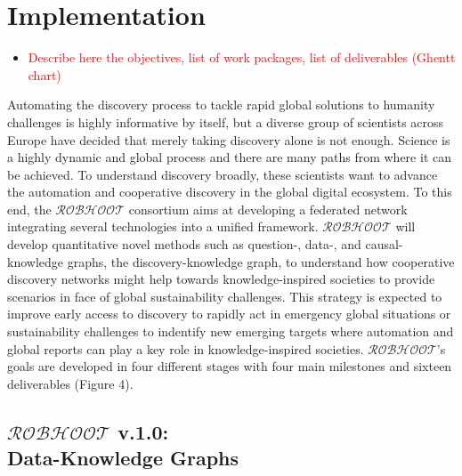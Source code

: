 \documentclass[11pt, a4paper]{article} %
\begin{document}
\section{Implementation}

\begin{itemize}
\item \textcolor{red}{Describe here the objectives, list of work
    packages, list of deliverables (Ghentt chart)}
\end{itemize}
    
Automating the discovery process to tackle rapid global solutions to
humanity challenges is highly informative by itself, but a diverse
group of scientists across Europe have decided that merely taking
discovery alone is not enough. Science is a highly dynamic and global
process and there are many paths from where it can be achieved. To
understand discovery broadly, these scientists want to advance the
automation and cooperative discovery in the global digital
ecosystem. To this end, the $\mathcal{ROBHOOT}$ consortium aims at
developing a federated network integrating several technologies into a
unified framework. $\mathcal{ROBHOOT}$ will develop quantitative novel
methods such as question-, data-, and causal-knowledge graphs, the
discovery-knowledge graph, to understand how cooperative discovery
networks might help towards knowledge-inspired societies to provide
scenarios in face of global sustainability challenges. This strategy
is expected to improve early access to discovery to rapidly act in
emergency global situations or sustainability challenges to indentify
new emerging targets where automation and global reports can play a
key role in knowledge-inspired societies. $\mathcal{ROBHOOT}$'s goals
are developed in four different stages with four main milestones and
sixteen deliverables (Figure 4).

\subsection{{\bf $\mathcal{ROBHOOT}$ v.1.0}: \\ Data-Knowledge Graphs}
\end{document}
